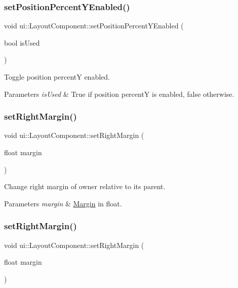 \subsubsection{\texorpdfstring{set\+Position\+Percent\+Y\+Enabled()}{setPositionPercentYEnabled()}\hspace{0.1cm}{\footnotesize\ttfamily [2/2]}}
{\footnotesize\ttfamily void ui\+::\+Layout\+Component\+::set\+Position\+Percent\+Y\+Enabled (\begin{DoxyParamCaption}\item[{bool}]{is\+Used }\end{DoxyParamCaption})}

Toggle position percentY enabled. 
\begin{DoxyParams}{Parameters}
{\em is\+Used} & True if position percentY is enabled, false otherwise. \\
\hline
\end{DoxyParams}
\mbox{\label{classui_1_1LayoutComponent_a29db78fd2bd2fce9ce04526ae55377e3}} 
\subsubsection{\texorpdfstring{set\+Right\+Margin()}{setRightMargin()}\hspace{0.1cm}{\footnotesize\ttfamily [1/2]}}
{\footnotesize\ttfamily void ui\+::\+Layout\+Component\+::set\+Right\+Margin (\begin{DoxyParamCaption}\item[{float}]{margin }\end{DoxyParamCaption})}

Change right margin of owner relative to its parent. 
\begin{DoxyParams}{Parameters}
{\em margin} & \hyperlink{classui_1_1Margin}{Margin} in float. \\
\hline
\end{DoxyParams}
\mbox{\label{classui_1_1LayoutComponent_a29db78fd2bd2fce9ce04526ae55377e3}} 
\subsubsection{\texorpdfstring{set\+Right\+Margin()}{setRightMargin()}\hspace{0.1cm}{\footnotesize\ttfamily [2/2]}}
{\footnotesize\ttfamily void ui\+::\+Layout\+Component\+::set\+Right\+Margin (\begin{DoxyParamCaption}\item[{float}]{margin }\end{DoxyParamCaption})}

